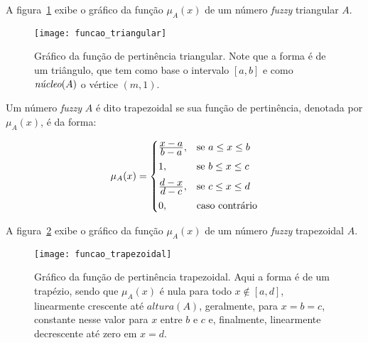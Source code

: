 A figura~\ref{fig:funcao_fuzzy_triangular} exibe o gráfico da função $\mu_A(x)$ de um número \emph{fuzzy} triangular $A$.

\begin{figure}[!h]
  \centering
  \texttt{[image: funcao\_triangular]}
  \caption[Gráfico da função de pertinência triangular]{Gráfico da função de pertinência triangular. Note que a forma é de um triângulo, que tem como base o intervalo $[a, b]$ e como $\emph{núcleo}(A)$ o vértice $(m, 1)$.}
  \label{fig:funcao_fuzzy_triangular}
\end{figure}

\begin{defn}
\label{def:funcao_fuzzy_trapezoidal}
Um número \emph{fuzzy} $A$ é dito trapezoidal se sua função de pertinência, denotada por $\mu_{A}(x)$, é da forma:

\begin{equation}
  \mu_A(x) =  \begin{cases}
                \frac{\displaystyle x - a}{\displaystyle b - a}, & \text{se}\ a \leq x \leq b\\[0.5em]
                1, & \text{se}\ b \leq x \leq c\\[0.5em]
                \frac{\displaystyle d - x}{\displaystyle d - c}, & \text{se}\ c \leq x \leq d\\[0.5em]
                0, & \text{caso contrário}
              \end{cases}
\end{equation}
\end{defn}

A figura~\ref{fig:funcao_fuzzy_trapezoidal} exibe o gráfico da função $\mu_A(x)$ de um número \emph{fuzzy} trapezoidal $A$.

\begin{figure}[!h]
  \centering
  \texttt{[image: funcao\_trapezoidal]}
  \caption[Gráfico da função de pertinência trapezoidal]{Gráfico da função de pertinência trapezoidal. Aqui a forma é de um trapézio, sendo que $\mu_A(x)$ é nula para todo $x \notin [a, d]$, linearmente  crescente  até $altura(A)$, geralmente, para $x = b = c$, constante nesse valor para $x$ entre $b$ e $c$ e, finalmente, linearmente decrescente até zero em $x = d$.}
  \label{fig:funcao_fuzzy_trapezoidal}
\end{figure}

